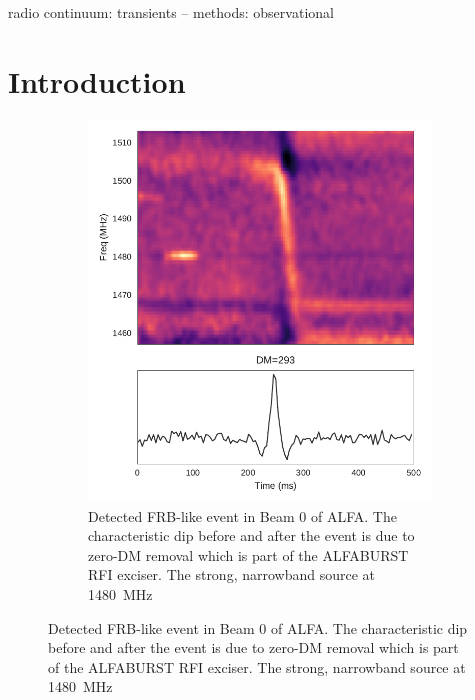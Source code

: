 \documentclass[a4paper,fleqn,usenatbib]{mnras}
\begin{document}
\begin{keywords}
radio continuum: transients -- methods: observational
\end{keywords}


\section{Introduction}
\label{sec:intro}

\begin{figure}
    \centering
    \begin{subfigure}[t]{0.45\textwidth}
        \centering\captionsetup{width=.95\linewidth}
        \includegraphics[width=1.0\textwidth]{figures/D20161204_buf23_Beam0.pdf}
        \caption{Detected FRB-like event in Beam 0 of ALFA. The characteristic
        dip before and after the event is due to zero-DM removal which is part
        of the ALFABURST RFI exciser. The strong, narrowband source at 1480~MHz
}
\end{subfigure}
\end{figure}
\end{document}
